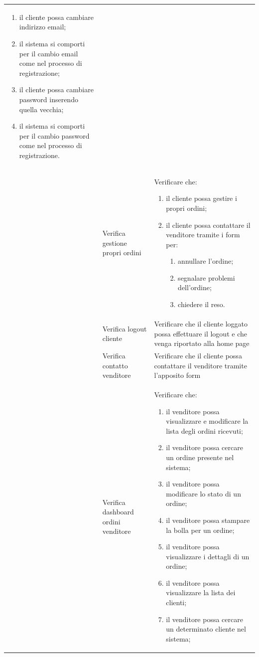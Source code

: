 \begin{center}
\begin{longtable}{|p{1cm}|p{4.85cm}|p{9cm}|}
	\begin{enumerate}
		\item il cliente possa cambiare indirizzo email;
		\item il sistema si comporti per il cambio email come nel processo di registrazione;
		\item il cliente possa cambiare password inserendo quella vecchia;
		\item il sistema si comporti per il cambio password come nel processo di registrazione. 
	\end{enumerate} \\

	 & Verifica gestione propri ordini & Verificare che:
	\begin{enumerate}
		\item il cliente possa gestire i propri ordini;
		\item il cliente possa contattare il venditore tramite i form per:
		\begin{enumerate}
			\item annullare l'ordine;
			\item segnalare problemi dell'ordine;
			\item chiedere il reso.
		\end{enumerate}
	\end{enumerate} \\
	 & Verifica logout cliente & Verificare che il cliente loggato possa effettuare il logout e che venga riportato alla home page \\
	 & Verifica contatto venditore & Verificare che il cliente possa contattare il venditore tramite l'apposito form  \\
	 & Verifica dashboard ordini venditore & Verificare che:
	\begin{enumerate}
		\item il venditore possa visualizzare e modificare la lista degli ordini ricevuti;
		\item il venditore possa cercare un ordine presente nel sistema;
		\item il venditore possa modificare lo stato di un ordine;
		\item il venditore possa stampare la bolla per un ordine;
		\item il venditore possa visualizzare i dettagli di un ordine;
		\item il venditore possa visualizzare la lista dei clienti;
		\item il venditore possa cercare un determinato cliente nel sistema;

\end{enumerate}
\end{longtable}
\end{center}
